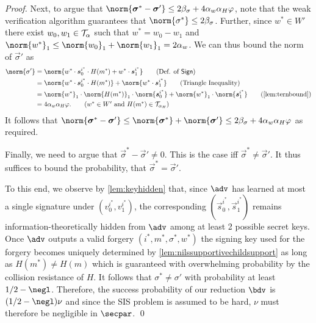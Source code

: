 \begin{proof}
  Next, to argue that $\norm{\vec{\sigma}^*-\vec{\sigma}'}\leq 2\beta_\sigma + 4\alpha_w\alpha_H\varphi$, note that the weak verification algorithm guarantees that $\norm{\sigma^*} \leq 2\beta_\sigma$.
  Further, since $w^*\in W'$ there exist $w_0,w_1 \in \mathcal{T}_\alpha$ such that $w^* = w_0-w_1$ and $\norm{w^*}_1 \leq \norm{w_0}_1 + \norm{w_1}_1 = 2\alpha_w$.
  We can thus bound the norm of $\vec{\sigma}'$ as
  \begin{align*}
    \norm{\sigma'} ={}& \norm{w^*\cdot\vec{s}^{i^*}_0\cdot H(m^*)+ w^*\cdot\vec{s}^{i^*}_1}\tag{Def. of $\sign$}\\
    ={}&\norm{w^*\cdot\vec{s}^{i^*}_0\cdot H(m^*)}+ \norm{w^*\cdot\vec{s}^{i^*}_1}\tag{Triangle Inequality}\\
    ={}&\norm{w^*}_1\cdot\norm{H(m^*)}_1\cdot\norm{\vec{s}^{i^*}_0} + \norm{w^*}_1\cdot\norm{\vec{s}^{i^*}_1}\tag{\autoref{lem:ternbound}}\\
    ={}&4\alpha_w\alpha_H\varphi.\tag{$w^*\in W'$ and $H(m^*)\in\tern_{\alpha_H}$}
  \end{align*}
  It follows that $\norm{\vec{\sigma}^*-\vec{\sigma}'} \leq \norm{\vec{\sigma}^*}+\norm{\vec{\sigma}'} \leq 2\beta_\sigma + 4\alpha_w\alpha_H\varphi$ as required.

  Finally, we need to argue that $\vec{\sigma}^*-\vec{\sigma}'\neq 0$.
  This is the case iff $\vec{\sigma}^* \neq \vec{\sigma}'$.
  It thus suffices to bound the probability, that $\vec{\sigma}^*=\vec{\sigma}'$.

  To this end, we observe by \autoref{lem:keyhidden} that, since $\adv$ has learned at most a single signature under $(v_0^{i^*},v_1^{i^*})$, the corresponding $(\vec{s}_0^{i^*},\vec{s}_1^{i^*})$ remains information-theoretically hidden from $\adv$ among at least 2 possible secret keys.
  Once $\adv$ outputs a valid forgery $(i^*,m^*,\sigma^*,w^*)$ the signing key used for the forgery becomes uniquely determined by \autoref{lem:nilssupportivechildsupport} as long as $H(m^*)\neq H(m)$ which is guaranteed with overwhelming probability by the collision resistance of $H$.
  It follows that $\sigma^* \neq \sigma'$ with probability at least $1/2 - \negl$.
  Therefore, the success probability of our reduction $\bdv$ is $(1/2 - \negl) \nu$ and since the SIS problem is assumed to be hard, $\nu$ must therefore be negligible in $\secpar$.
  \qed
\end{proof}

